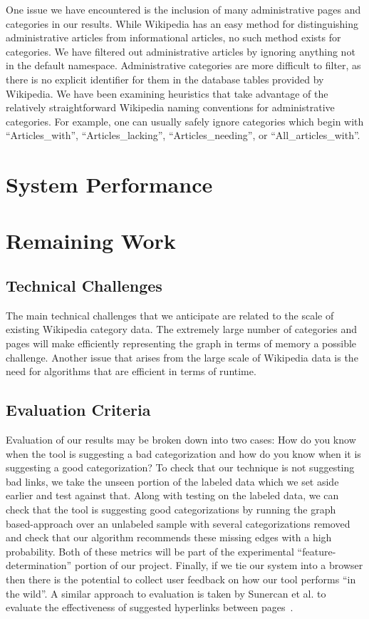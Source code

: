 \documentclass{sig-alternate}
\begin{document}
One issue we have encountered is the inclusion of many administrative pages and categories in our results. While Wikipedia has an easy method for distinguishing administrative articles from informational articles, no such method exists for categories. We have filtered out administrative articles by ignoring anything not in the default namespace. Administrative categories are more difficult to filter, as there is no explicit identifier for them in the database tables provided by Wikipedia. We have been examining heuristics that take advantage of the relatively straightforward Wikipedia naming conventions for administrative categories. For example, one can usually safely ignore categories which begin with ``Articles\_with'', ``Articles\_lacking'', ``Articles\_needing'', or ``All\_articles\_with''.

\section{System Performance}
\label{sec:system_performance}

\section{Remaining Work}
\label{sec:remaining_work}

\subsection{Technical Challenges}
\label{subsec:tech_challenges}
The main technical challenges that we anticipate are related to the scale of existing Wikipedia category data. The extremely large number of categories and pages will make efficiently representing the graph in terms of memory a possible challenge. Another issue that arises from the large scale of Wikipedia data is the need for algorithms that are efficient in terms of runtime. 

\subsection{Evaluation Criteria}
\label{subsec:eval_criteria}
Evaluation of our results may be broken down into two cases: How do you know when the tool is suggesting a bad categorization and how do you know when it is suggesting a good categorization? To check that our technique is not suggesting bad links, we take the unseen portion of the labeled data which we set aside earlier and test against that. Along with testing on the labeled data, we can check that the tool is suggesting good categorizations by running the graph based-approach over an unlabeled sample with several categorizations removed and check that our algorithm recommends these missing edges with a high probability. Both of these metrics will be part of the experimental ``feature-determination'' portion of our project. Finally, if we tie our system into a browser then there is the potential to collect user feedback on how our tool performs ``in the wild''. A similar approach to evaluation is taken by Sunercan et al.  to evaluate the effectiveness of suggested hyperlinks between pages~\cite{Sunercan}.
\end{document}
